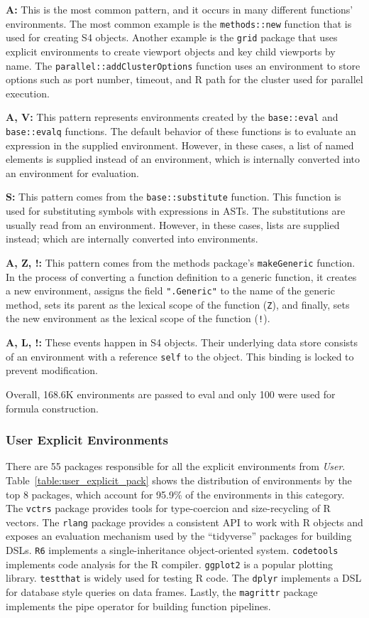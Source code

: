 \documentclass[10pt,review,sigplan,anonymous=true,authorversion=true,nonacm=true]{acmart}
\newcommand{\code}[1]{\lstinline |#1|\xspace}
\begin{document}
\noindent
\textbf{A:} This is the most common pattern, and it occurs in many different
functions' environments. The most common example is the \code{methods::new}
function that is used for creating S4 objects. Another example is the
\code{grid} package that uses explicit environments to create viewport objects
and key child viewports by name. The \code{parallel::addClusterOptions} function
uses an environment to store options such as port number, timeout, and R path
for the cluster used for parallel execution.

\noindent
\textbf{A, V:} This pattern represents environments created by the
\code{base::eval} and \code{base::evalq} functions. The default behavior of
these functions is to evaluate an expression in the supplied environment.
However, in these cases, a list of named elements is supplied instead of an
environment, which is internally converted into an environment for evaluation.

\noindent
\textbf{S:} This pattern comes from the \code{base::substitute} function. This
function is used for substituting symbols with expressions in ASTs. The
substitutions are usually read from an environment. However, in these cases,
lists are supplied instead; which are internally converted into environments.

\noindent
\textbf{A, Z, !:} This pattern comes from the methods package's
\code{makeGeneric} function. In the process of converting a function definition
to a generic function, it creates a new environment, assigns the field
\code{".Generic"} to the name of the generic method, sets its parent as the
lexical scope of the function (\texttt{Z}), and finally, sets the new
environment as the lexical scope of the function (\texttt{!}).

\noindent
\textbf{A, L, !:} These events happen in S4 objects. Their underlying data store
consists of an environment with a reference \code{self} to the object. This
binding is locked to prevent modification.

Overall, 168.6K environments are passed to eval and only 100 were used for
formula construction.


\subsubsection{User Explicit Environments}
There are 55 packages responsible for all the explicit environments from
\emph{User}. Table~\ref{table:user_explicit_pack} shows the distribution of
environments by the top 8 packages, which account for 95.9\% of the environments
in this category. The \code{vctrs} package provides tools for type-coercion and
size-recycling of R vectors. The \code{rlang} package provides a consistent API
to work with R objects and exposes an evaluation mechanism used by the
``tidyverse'' packages for building DSLs. \code{R6} implements a
single-inheritance object-oriented system. \code{codetools} implements code
analysis for the R compiler. \code{ggplot2} is a popular plotting library.
\code{testthat} is widely used for testing R code. The \code{dplyr} implements a
DSL for database style queries on data frames. Lastly, the \code{magrittr}
package implements the pipe operator for building function pipelines.
\end{document}
